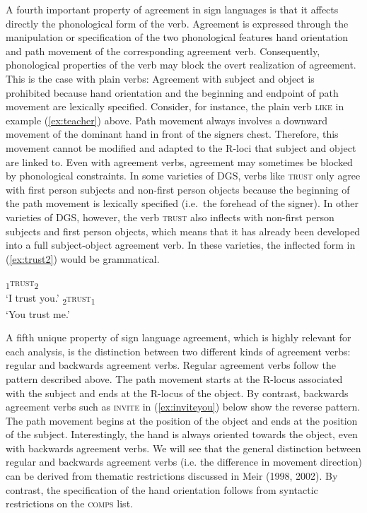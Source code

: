 \documentclass[11pt,a4paper,fleqn]{article}
\begin{document}
A fourth important property of agreement in sign languages is that it affects directly the phonological form of the verb. Agreement is expressed through the manipulation or specification of the two phonological features hand orientation and path movement of the corresponding agreement verb. Consequently, phonological properties of the verb may block the overt realization of agreement. This is the case with plain verbs: Agreement with subject and object is prohibited because hand orientation and the beginning and endpoint of path movement are lexically specified. Consider, for instance, the plain verb \textsc{like} in example (\ref{ex:teacher}) above. Path movement always involves a downward movement of the dominant hand in front of the signers chest. Therefore, this movement cannot be modified and adapted to the R-loci that subject and object are linked to. Even with agreement verbs, agreement may sometimes be blocked by phonological constraints. In some varieties of DGS, verbs like \textsc{trust} only agree with first person subjects and non-first person objects because the beginning of the path movement is lexically specified (i.e.~the forehead of the signer). In other varieties of DGS, however, the verb \textsc{trust} also inflects with non-first person subjects and first person objects, which means that it has already been developed into a full subject-object agreement verb. In these varieties, the inflected form in (\ref{ex:trust2}) would be grammatical.

\begin{exe}
	\ex \label{ex:trust}
	\begin{xlist}	
	\ex	\textsubscript{1}\textsc{trust}\textsubscript{2}		\\
		‘I trust you.’	\label{ex:trust1}
	\ex  *\textsubscript{2}\textsc{trust}\textsubscript{1}	\\
		‘You trust me.’ \label{ex:trust2}
	\end{xlist}
\end{exe}

A fifth unique property of sign language agreement, which is highly relevant for each analysis, is the distinction between two different kinds of agreement verbs: regular and backwards agreement verbs. Regular agreement verbs follow the pattern described above. The path movement starts at the R-locus associated with the subject and ends at the R-locus of the object. By contrast, backwards agreement verbs such as \textsc{invite} in (\ref{ex:inviteyou}) below show the reverse pattern. The path movement begins at the position of the object and ends at the position of the subject. Interestingly, the hand is always oriented towards the object, even with backwards agreement verbs. We will see that the general distinction between regular and backwards agreement verbs (i.e. the difference in movement direction) can be derived from thematic restrictions discussed in Meir (1998, 2002). By contrast, the specification of the hand orientation follows from syntactic restrictions on the \textsc{comps} list.
\end{document}
